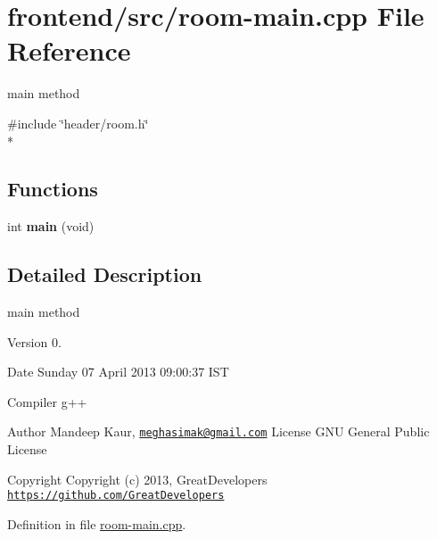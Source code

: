 \hypertarget{room-main_8cpp}{\section{frontend/src/room-\/main.cpp File Reference}
\label{room-main_8cpp}
}


main method  


{\ttfamily \#include \char`\"{}header/room.\-h\char`\"{}}\\*
\subsection*{Functions}
\begin{DoxyCompactItemize}
\item 
\hypertarget{room-main_8cpp_a840291bc02cba5474a4cb46a9b9566fe}{int {\bfseries main} (void)}\label{room-main_8cpp_a840291bc02cba5474a4cb46a9b9566fe}

\end{DoxyCompactItemize}


\subsection{Detailed Description}
main method \begin{DoxyVersion}{Version}
0. 
\end{DoxyVersion}
\begin{DoxyDate}{Date}
Sunday 07 April 2013 09\-:00\-:37 I\-S\-T\par
Compiler g++
\end{DoxyDate}
\begin{DoxyAuthor}{Author}
Mandeep Kaur, \href{mailto:meghasimak@gmail.com}{\tt meghasimak@gmail.\-com} License G\-N\-U General Public License 
\end{DoxyAuthor}
\begin{DoxyCopyright}{Copyright}
Copyright (c) 2013, Great\-Developers \href{https://github.com/GreatDevelopers}{\tt https\-://github.\-com/\-Great\-Developers} 
\end{DoxyCopyright}


Definition in file \hyperlink{room-main_8cpp_source}{room-\/main.\-cpp}.


